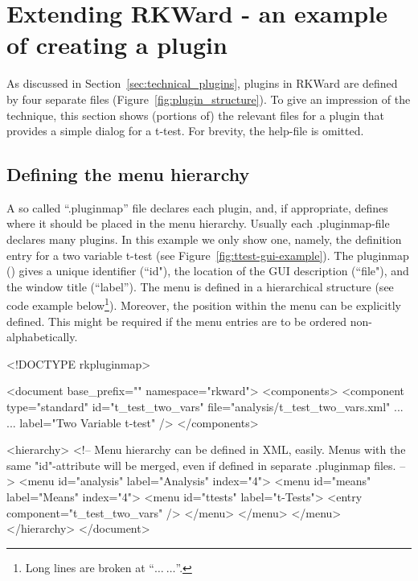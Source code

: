 \section{Extending RKWard - an example of creating a plugin}
\label{sec:example_plugin}
As discussed in Section~\ref{sec:technical_plugins}, plugins in RKWard are
defined by four separate files (Figure~\ref{fig:plugin_structure}). To give an impression of the technique,
this section shows (portions of) the relevant files for a plugin that provides
a simple dialog for a t-test. For brevity, the help-file is omitted.

\subsection{Defining the menu hierarchy}
\label{sec:defining_menu_hierarchy}
A so called ``.pluginmap'' file declares each plugin, and, if appropriate, defines where it should
be placed in the menu hierarchy. Usually each .pluginmap-file declares many plugins. In this example
we only show one, namely, the definition entry for a two variable t-test (see Figure~\ref{fig:ttest-gui-example}). 
The pluginmap () gives a unique identifier (``id"), the location of the GUI description (``file"), and the window title (``label''). The menu
is defined in a hierarchical structure (see code example below\footnote{Long lines are broken at ``$\ldots~\ldots$''.}). Moreover, the position within the menu can be explicitly defined.
This might be required if the menu entries are to be ordered non-alphabetically.

\begin{footnotesize}
\begin{Code}
<!DOCTYPE rkpluginmap>

<document base_prefix="" namespace="rkward">
  <components>
    <component type="standard" id="t_test_two_vars" file="analysis/t_test_two_vars.xml" ...
      ... label="Two Variable t-test" />
  </components>

  <hierarchy>
    <!-- Menu hierarchy can be defined in XML, easily.
    Menus with the same "id"-attribute will be merged, even if defined in
    separate .pluginmap files. -->
    <menu id="analysis" label="Analysis" index="4">
      <menu id="means" label="Means" index="4">
        <menu id="ttests" label="t-Tests">
          <entry component="t_test_two_vars" />
        </menu>
      </menu>
    </menu>
  </hierarchy>
</document>
\end{Code}
\end{footnotesize}


